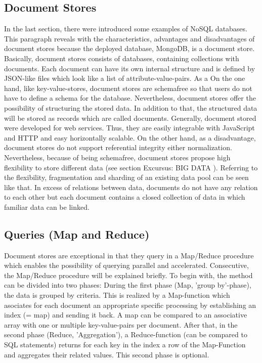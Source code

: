\subsection{Document Stores} \label{documentstore}

In the last section, there were introduced some examples of NoSQL databases. This paragraph reveals with the characteristics, advantages and disadvantages of document stores because the deployed database, MongoDB, is a document store. 
Basically, document stores consists of databases, containing collections with documents. Each document can have its own internal structure and is defined by JSON-like files which look like a list of attribute-value-pairs. As a 
On the one hand, like key-value-stores, document stores are schemafree so that users do not have to define a schema for the database. Nevertheless, document stores offer the possibility of structuring the stored data. In addition to that, the structured data will be stored as records which are called documents. Generally, document stored were developed for web services. Thus, they are easily integrable with JavaScript and \ac{HTTP} and easy horizontally scalable. 
On the other hand, as a disadvantage, document stores do not support referential integrity either normalization.
Nevertheless, because of being schemafree, document stores propose high flexibility to store different data (see section Excursus: BIG DATA \pageref{bigdata}). Referring to the flexibility, fragmentation and sharding of an existing data pool can be seen like that. In excess of relations between data, documents do not have any relation to each other but each document contains a closed collection of data in which familiar data can be linked.

\subsection{Queries (Map and Reduce)}

Document stores are exceptional in that they query in a Map/Reduce procedure which enables the possibility of querying parallel and accelerated. Consecutive, the Map/Reduce procedure will be explained briefly. 
To begin with, the method can be divided into two phases: During the first phase (Map, 'group by'-phase), the data is grouped by criteria. This is realized by a Map-function which asociates for each document an appropriate specific processing by establishing an index (= map) and sending it back. A map can be compared to an associative array with one or multiple key-value-pairs per document.  
After that, in the second phase (Reduce, 'Aggregation'), a Reduce-function (can be compared to SQL statements) returns for each key in the index a row of the Map-Function and aggregates their related values. This second phase is optional.

